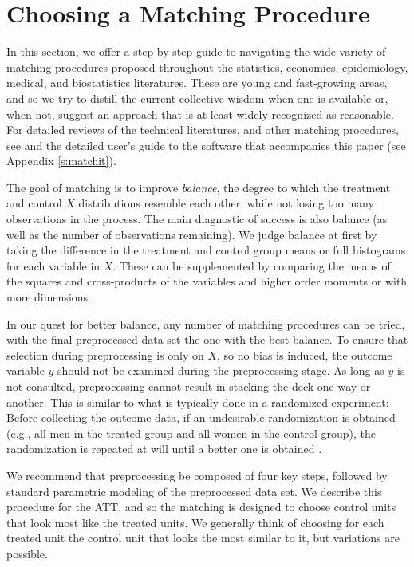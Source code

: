 \documentclass[11pt,titlepage]{article}
\begin{document}
\section{Choosing a Matching Procedure}

In this section, we offer a step by step guide to navigating the wide
variety of matching procedures proposed throughout the statistics,
economics, epidemiology, medical, and biostatistics literatures.
These are young and fast-growing areas, and so we try to distill the
current collective wisdom when one is available or, when not, suggest
an approach that is at least widely recognized as reasonable.  For
detailed reviews of the technical literatures, and other matching
procedures, see \citep{Imbens04,Rosenbaum02,Stuart04} and
the detailed user's guide to the software that accompanies this paper
(see Appendix \ref{s:matchit}).

The goal of matching is to improve \emph{balance}, the degree to which
the treatment and control $X$ distributions resemble each other, while
not losing too many observations in the process.  The main diagnostic
of success is also balance (as well as the number of observations
remaining).  We judge balance at first by taking the difference in the
treatment and control group means or full histograms for each variable
in $X$.  These can be supplemented by comparing the means of the
squares and cross-products of the variables and higher order moments
or with more dimensions.

In our quest for better balance, any number of matching procedures can
be tried, with the final preprocessed data set the one with the best
balance.  To ensure that selection during preprocessing is only on
$X$, so no bias is induced, the outcome variable $y$ should not be
examined during the preprocessing stage.  As long as $y$ is not
consulted, preprocessing cannot result in stacking the deck one way or
another.  This is similar to what is typically done in a randomized
experiment: Before collecting the outcome data, if an undesirable
randomization is obtained (e.g., all men in the treated group and all
women in the control group), the randomization is repeated at will
until a better one is obtained \citep[see][]{Rubin01}.

We recommend that preprocessing be composed of four key steps,
followed by standard parametric modeling of the preprocessed data set.
We describe this procedure for the ATT, and so the matching is
designed to choose control units that look most like the treated
units.  We generally think of choosing for each treated unit the
control unit that looks the most similar to it, but variations are
possible.
\end{document}
